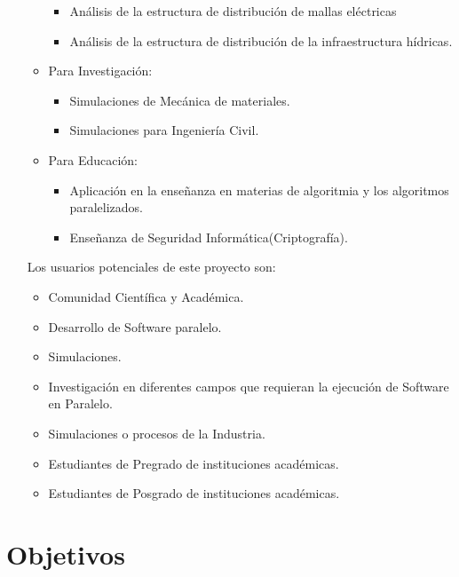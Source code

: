 \begin{itemize}
\begin{itemize}
\begin{itemize}
			\item Análisis de la estructura de distribución de mallas eléctricas 
			\item Análisis de la estructura de distribución de la infraestructura hídricas.

		\end{itemize}

		\item Para Investigación: 

		\begin{itemize}
			\item Simulaciones de Mecánica de materiales.
			\item Simulaciones para Ingeniería Civil.		
		\end{itemize}

		\item Para Educación: 
			\begin{itemize}
				\item Aplicación en la enseñanza en materias de algoritmia y los algoritmos paralelizados.
				\item Enseñanza de Seguridad Informática(Criptografía).
			\end{itemize}

	\end{itemize}

	Los usuarios potenciales de este proyecto son: 

		\begin{itemize}
			\item Comunidad Científica y Académica.
			\item Desarrollo de Software paralelo. 
			\item Simulaciones.
			\item Investigación en diferentes campos que requieran la ejecución de Software en Paralelo. 
			\item Simulaciones o procesos de la Industria.
			\item Estudiantes de Pregrado de instituciones académicas.
			\item Estudiantes de Posgrado de instituciones académicas.
		\end{itemize}

\end{itemize}

\newpage

\section{Objetivos}

